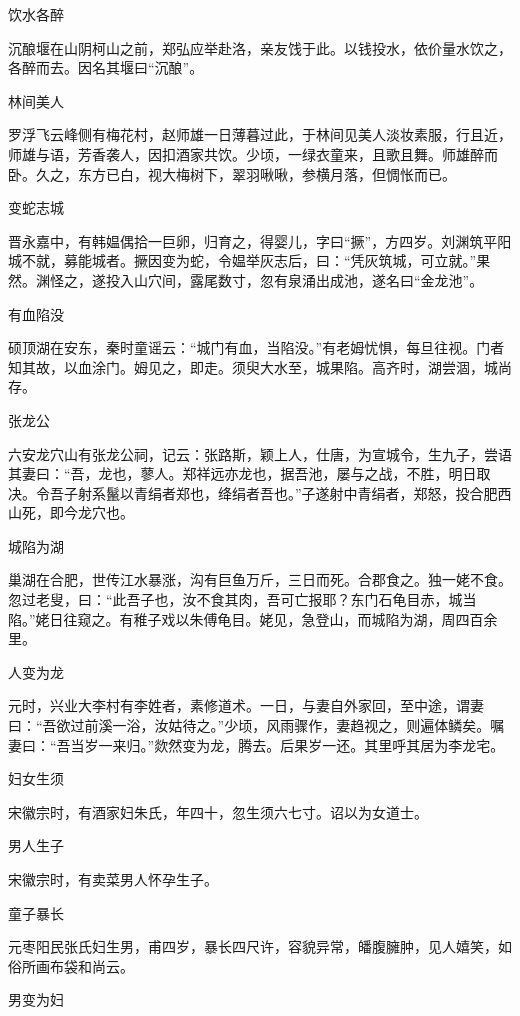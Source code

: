 \documentclass[a4paper,12pt,UTF8,twoside]{ctexbook}
\begin{document}
    饮水各醉
    
    沉酿堰在山阴柯山之前，郑弘应举赴洛，亲友饯于此。以钱投水，依价量水饮之，各醉而去。因名其堰曰“沉酿”。
    
    林间美人
    
    罗浮飞云峰侧有梅花村，赵师雄一日薄暮过此，于林间见美人淡妆素服，行且近，师雄与语，芳香袭人，因扣酒家共饮。少顷，一绿衣童来，且歌且舞。师雄醉而卧。久之，东方已白，视大梅树下，翠羽啾啾，参横月落，但惆怅而已。
    
    变蛇志城
    
    晋永嘉中，有韩媪偶拾一巨卵，归育之，得婴儿，字曰“撅”，方四岁。刘渊筑平阳城不就，募能城者。撅因变为蛇，令媪举灰志后，曰：“凭灰筑城，可立就。”果然。渊怪之，遂投入山穴间，露尾数寸，忽有泉涌出成池，遂名曰“金龙池”。
    
    有血陷没
    
    硕顶湖在安东，秦时童谣云：“城门有血，当陷没。”有老姆忧惧，每旦往视。门者知其故，以血涂门。姆见之，即走。须臾大水至，城果陷。高齐时，湖尝涸，城尚存。
    
    张龙公
    
    六安龙穴山有张龙公祠，记云：张路斯，颖上人，仕唐，为宣城令，生九子，尝语其妻曰：“吾，龙也，蓼人。郑祥远亦龙也，据吾池，屡与之战，不胜，明日取决。令吾子射系鬣以青绢者郑也，绛绢者吾也。”子遂射中青绢者，郑怒，投合肥西山死，即今龙穴也。
    
    城陷为湖
    
    巢湖在合肥，世传江水暴涨，沟有巨鱼万斤，三日而死。合郡食之。独一姥不食。忽过老叟，曰：“此吾子也，汝不食其肉，吾可亡报耶？东门石龟目赤，城当陷。”姥日往窥之。有稚子戏以朱傅龟目。姥见，急登山，而城陷为湖，周四百余里。
    
    人变为龙
    
    元时，兴业大李村有李姓者，素修道术。一日，与妻自外家回，至中途，谓妻曰：“吾欲过前溪一浴，汝姑待之。”少顷，风雨骤作，妻趋视之，则遍体鳞矣。嘱妻曰：“吾当岁一来归。”欻然变为龙，腾去。后果岁一还。其里呼其居为李龙宅。
    
    妇女生须
    
    宋徽宗时，有酒家妇朱氏，年四十，忽生须六七寸。诏以为女道士。
    
    男人生子
    
    宋徽宗时，有卖菜男人怀孕生子。
    
    童子暴长
    
    元枣阳民张氏妇生男，甫四岁，暴长四尺许，容貌异常，皤腹臃肿，见人嬉笑，如俗所画布袋和尚云。
    
    男变为妇
    
\end{document}
